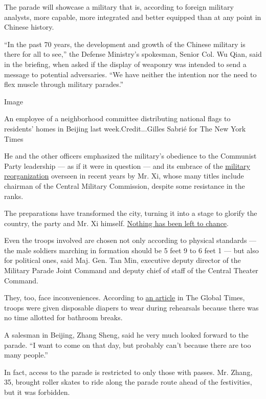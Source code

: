 The parade will showcase a military that is, according to foreign
military analysts, more capable, more integrated and better equipped
than at any point in Chinese history.

``In the past 70 years, the development and growth of the Chinese
military is there for all to see,'' the Defense Ministry's spokesman,
Senior Col. Wu Qian, said in the briefing, when asked if the display of
weaponry was intended to send a message to potential adversaries. ``We
have neither the intention nor the need to flex muscle through military
parades.''

Image

An employee of a neighborhood committee distributing national flags to
residents' homes in Beijing last week.Credit...Gilles Sabrié for The New
York Times

He and the other officers emphasized the military's obedience to the
Communist Party leadership --- as if it were in question --- and its
embrace of the
\href{https://www.nytimes.com/2017/10/11/world/asia/xi-jinping-military-china-purge.html}{military
reorganization} overseen in recent years by Mr. Xi, whose many titles
include chairman of the Central Military Commission, despite some
resistance in the ranks.

The preparations have transformed the city, turning it into a stage to
glorify the country, the party and Mr. Xi himself.
\href{https://www.nytimes.com/2019/09/23/world/asia/china-xi-jinping-communist-party-70th-anniversary.html}{Nothing
has been left to chance}.

Even the troops involved are chosen not only according to physical
standards --- the male soldiers marching in formation should be 5 feet 9
to 6 feet 1 --- but also for political ones, said Maj. Gen. Tan Min,
executive deputy director of the Military Parade Joint Command and
deputy chief of staff of the Central Theater Command.

They, too, face inconveniences. According to
\href{http://www.globaltimes.cn/content/1163738.shtml}{an article} in
The Global Times, troops were given disposable diapers to wear during
rehearsals because there was no time allotted for bathroom breaks.

A salesman in Beijing, Zhang Sheng, said he very much looked forward to
the parade. ``I want to come on that day, but probably can't because
there are too many people.''

In fact, access to the parade is restricted to only those with passes.
Mr. Zhang, 35, brought roller skates to ride along the parade route
ahead of the festivities, but it was forbidden.


